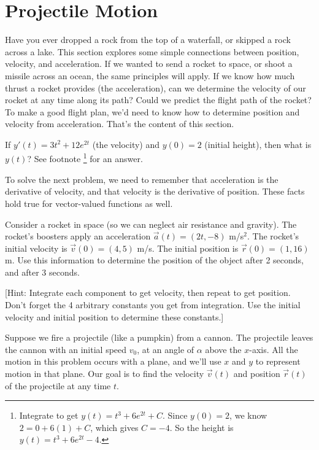 \section{Projectile Motion}

Have you ever dropped a rock from the top of a waterfall, or skipped a rock across a lake. This section explores some simple connections between position, velocity, and acceleration. If we wanted to send a rocket to space, or shoot a missile across an ocean, the same principles will apply. If we know how much thrust a rocket provides (the acceleration), can we determine the velocity of our rocket at any time along its path?  Could we predict the flight path of the rocket? To make a good flight plan, we'd need to know how to determine position and velocity from acceleration.  That's the content of this section.  

\begin{review*}
 If $y'(t) = 3t^2+12e^{2t}$ (the velocity) and $y(0)=2$ (initial height), then what is $y(t)$? See footnote \footnote{Integrate to get $y(t) = t^3+6e^{2t}+C$. Since $y(0)=2$, we know $2=0+6(1)+C$, which gives $C=-4$. So the height is $y(t) = t^3+6e^{2t}-4$. } for an answer. 
\end{review*}


To solve the next problem, we need to remember that acceleration is the derivative of velocity, and that velocity is the derivative of position.  These facts hold true for vector-valued functions as well.


\begin{problem}
Consider a rocket in space (so we can neglect air resistance and gravity). The rocket's boosters apply an acceleration $\vec a(t) = (2t,-8)$ m/s$^2$. The rocket's initial velocity is $\vec v(0) = (4,5)$ m/s.  The initial position is $\vec r(0) = (1,16)$ m. Use this information to determine the position of the object after 2 seconds, and after 3 seconds. 

[Hint: Integrate each component to get velocity, then repeat to get position. Don't forget the 4 arbitrary constants you get from integration. Use the initial velocity and initial position to determine these constants.]
\end{problem}

Suppose we fire a projectile (like a pumpkin) from a cannon. The projectile leaves the cannon with an initial speed $v_0$, at an angle of $\alpha$ above the $x$-axis. All the motion in this problem occurs with a plane, and we'll use $x$ and $y$ to represent motion in that plane. Our goal is to find the velocity $\vec v(t)$ and position $\vec r(t)$  of the projectile at any time $t$. 

